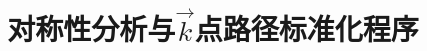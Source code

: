 \documentclass{article}      %
\begin{document}
\graphicspath{{Figures/}}
%
\renewcommand{\abstractname}{\small{\CJKfamily{hei} 摘\quad 要}} %
\renewcommand{\refname}{\centering\CJKfamily{hei} 参考文献}
\renewcommand{\figurename}{{\bf Fig}.}
\renewcommand{\tablename}{{\bf Tab}.}

\makeatletter
\long{}
\makeatother

\newcommand{\keywords}[1]{{\hspace{0\ccwd}\small{\CJKfamily{hei} 关键词:}{\hspace{2ex}{#1}}\bigskip}}



\title{对称性分析与$\vec k$点路径标准化程序}

\author{
\small
\small
}
\date{}					%
\maketitle
\end{document}

